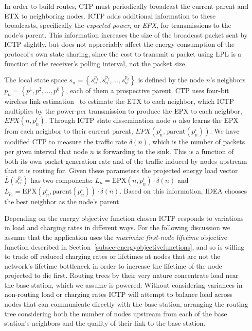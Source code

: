 In order to build routes, CTP must periodically broadcast the current parent
and ETX to neighboring nodes.  ICTP adds additional information to these
broadcasts, specifically the {\em expected power}, or {\em EPX}, for
transmissions to the node's parent. This information increases the size of
the broadcast packet sent by ICTP slightly, but does not appreciably affect
the energy consumption of the protocol's own state sharing, since the cost to
transmit a packet using LPL is a function of the receiver's polling interval,
not the packet size.

The local state space $s_n = \left\{s_n^{p_1}, s_n^{p_2}, \ldots, s_n^{p_k}
\right\}$ is defined by the node $n$'s neighbors $p_n = \left\{p^1, p^2,
\ldots, p^k \right\}$, each of them a prospective parent. CTP uses four-bit
wireless link estimation~\cite{Fonseca07} to estimate the ETX to each
neighbor, which ICTP multiplies by the power-per transmission to produce the
EPX to each neighbor, $EPX(n, p_n^i)$. Through ICTP state dissemination node
$n$ also learns the EPX from each neighbor to their current parent,
$EPX(p_n^i, \textrm{parent}(p_n^i))$. We have modified CTP to measure the
traffic rate $\delta(n)$, which is the number of packets per given interval
that node $n$ is forwarding to the sink. This is a function of both its own
packet generation rate and of the traffic induced by nodes upstream that it
is routing for. Given these parameters the projected energy load vector
$\bar{L}(s_n^{p_i})$ has two components: $L_n = \textrm{EPX}(n, p_n^i) \cdot
\delta(n)$ and $L_{p_i} = \textrm{EPX}(p_n^i, \textrm{parent}(p_n^i)) \cdot
\delta(n)$. Based on this information, IDEA chooses the best neighbor as the
node's parent.

Depending on the energy objective function chosen ICTP responds to variations
in load and charging rates in different ways. For the following discussion we
assume that the application uses the \textit{maximize first-node lifetime}
objective function described in
Section~\ref{subsec-energyobjectivefunctions}, and so is willing to trade off
reduced charging rates or lifetimes at nodes that are not the network's
lifetime bottleneck in order to increase the lifetime of the node projected
to die first. Routing trees by their very nature concentrate load near the
base station, which we assume is powered. Without considering variances in
non-routing load or charging rates ICTP will attempt to balance load across
nodes that can communicate directly with the base station, arranging the
routing tree considering both the number of nodes upstream from each of the
base station's neighbors and the quality of their link to the base station.

